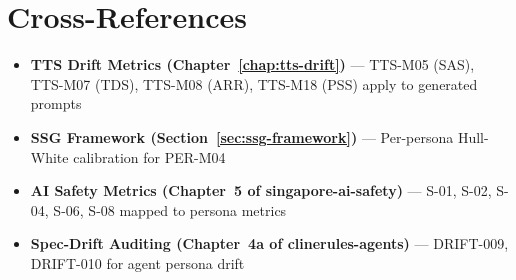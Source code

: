 \section{Cross-References}

\begin{itemize}
  \item \textbf{TTS Drift Metrics (Chapter~\ref{chap:tts-drift})} --- TTS-M05 (SAS),
        TTS-M07 (TDS), TTS-M08 (ARR), TTS-M18 (PSS) apply to generated prompts
  \item \textbf{SSG Framework (Section~\ref{sec:ssg-framework})} --- Per-persona
        Hull-White calibration for PER-M04
  \item \textbf{AI Safety Metrics (Chapter~5 of singapore-ai-safety)} --- S-01, S-02,
        S-04, S-06, S-08 mapped to persona metrics
  \item \textbf{Spec-Drift Auditing (Chapter~4a of clinerules-agents)} --- DRIFT-009,
        DRIFT-010 for agent persona drift
\end{itemize}
